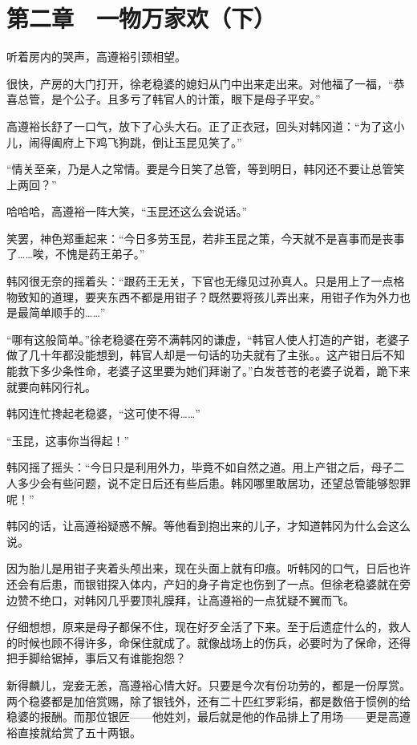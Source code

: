 \section{第二章　一物万家欢（下）}

听着房内的哭声，高遵裕引颈相望。

很快，产房的大门打开，徐老稳婆的媳妇从门中出来走出来。对他福了一福，“恭喜总管，是个公子。且多亏了韩官人的计策，眼下是母子平安。”

高遵裕长舒了一口气，放下了心头大石。正了正衣冠，回头对韩冈道：“为了这小儿，闹得阖府上下鸡飞狗跳，倒让玉昆见笑了。”

“情关至亲，乃是人之常情。要是今日笑了总管，等到明日，韩冈还不要让总管笑上两回？”

哈哈哈，高遵裕一阵大笑，“玉昆还这么会说话。”

笑罢，神色郑重起来：“今日多劳玉昆，若非玉昆之策，今天就不是喜事而是丧事了……唉，不愧是药王弟子。”

韩冈很无奈的摇着头：“跟药王无关，下官也无缘见过孙真人。只是用上了一点格物致知的道理，要夹东西不都是用钳子？既然要将孩儿弄出来，用钳子作为外力也是最简单顺手的……”

“哪有这般简单。”徐老稳婆在旁不满韩冈的谦虚，“韩官人使人打造的产钳，老婆子做了几十年都没能想到，韩官人却是一句话的功夫就有了主张。。这产钳日后不知能救下多少条性命，老婆子这里要为她们拜谢了。”白发苍苍的老婆子说着，跪下来就要向韩冈行礼。

韩冈连忙搀起老稳婆，“这可使不得……”

“玉昆，这事你当得起！”

韩冈摇了摇头：“今日只是利用外力，毕竟不如自然之道。用上产钳之后，母子二人多少会有些问题，说不定日后还有些后患。韩冈哪里敢居功，还望总管能够恕罪呢！”

韩冈的话，让高遵裕疑惑不解。等他看到抱出来的儿子，才知道韩冈为什么会这么说。

因为胎儿是用钳子夹着头颅出来，现在头面上就有印痕。听韩冈的口气，日后也许还会有后患，而银钳探入体内，产妇的身子肯定也伤到了一点。但徐老稳婆就在旁边赞不绝口，对韩冈几乎要顶礼膜拜，让高遵裕的一点犹疑不翼而飞。

仔细想想，原来是母子都保不住，现在好歹全活了下来。至于后遗症什么的，救人的时候也顾不得许多，命保住就成了。就像战场上的伤兵，必要时为了保命，还得把手脚给锯掉，事后又有谁能抱怨？

新得麟儿，宠妾无恙，高遵裕心情大好。只要是今次有份功劳的，都是一份厚赏。两个稳婆都是加倍赏赐，除了银钱外，还有二十匹红罗彩绢，都是数倍于惯例的给稳婆的报酬。而那位银匠——他姓刘，最后就是他的作品排上了用场——更是高遵裕直接就给赏了五十两银。


